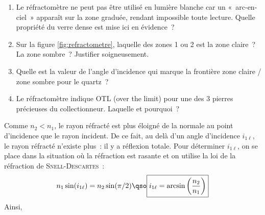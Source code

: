 \documentclass[a4paper, 10pt, garamond, oneside]{book}
\begin{document}
{	\begin{enumerate}
		\item Le réfractomètre ne peut pas être utilisé en lumière blanche car un
		      «~arc-en-ciel~» apparaît sur la zone graduée, rendant impossible toute
		      lecture. Quelle propriété du verre dense est mise ici en évidence~?
		\item Sur la figure \ref{fig:refractometre}, laquelle des zones 1 ou  2 est
		      la zone claire~? La zone sombre~? Justifier soigneusement.
		\item Quelle est la valeur de l'angle d'incidence qui marque la frontière
		      zone claire / zone sombre pour le quartz~?
		\item Le réfractomètre indique OTL (over the limit) pour une des 3 pierres
		      précieuses du collectionneur. Laquelle et pourquoi~?
	\end{enumerate}
}{
	\begin{enumerate}
     Comme $n_2<n_1$, le rayon réfracté est plus éloigné de la normale au
		      point d'incidence que le rayon incident. De ce fait, au delà d'un
		      angle d'incidence $i_{1\ell}$, le rayon réfracté n'existe plus~: il y
		      a réflexion totale. Pour déterminer $i_{1\ell}$, on se place dans la
		      situation où la réfraction est rasante et on utilise la loi de la
		      réfraction de \textsc{Snell-Descartes}~:
		      \[
			      n_1\sin(i_{1\ell})=n_2\sin(\pi/2)
			      \qso
			      \boxed{i_{1\ell}=\arcsin\left(\frac{n_2}{n_1}\right)}
		      \]
		      Ainsi, %


\end{enumerate}}
\end{document}
